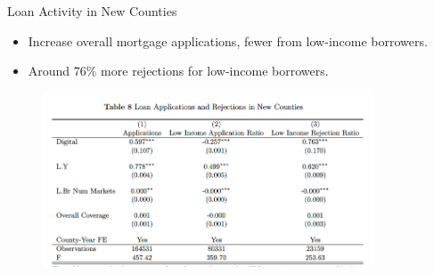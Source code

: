 \documentclass[notes,10pt, aspectratio=169]{beamer}
\newenvironment{wideitemize}{\itemize\addtolength{\itemsep}{10pt}}{\enditemize}
\begin{document}
\begin{frame}{Loan Activity in New Counties}

    \begin{itemize}
        \item Increase overall mortgage applications, fewer from low-income borrowers.
        \item Around 76\% more rejections for low-income borrowers.
    \end{itemize}

    \begin{figure}
        \centering
        \includegraphics[width=0.875\textwidth]{imgs/tab8.png}
    \end{figure}
    
\end{frame}





    
    
\end{document}
